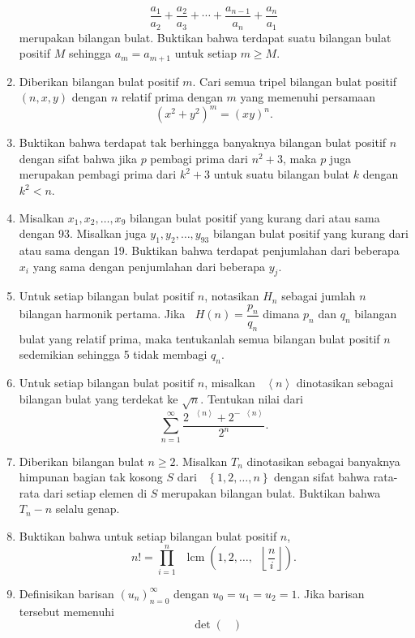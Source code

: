 \documentclass[12pt]{article}
\newcommand*\lrbr[1]{\mathop{}\!\left\lbrace#1\right\rbrace}
\newcommand*\floor[1]{\mathop{}\!\left\lfloor{#1}\right\rfloor}
\newcommand*\braket[1]{\mathop{}\!\left\langle{#1}\right\rangle}
\newcommand*\func[2]{\mathop{}\!{#1}{\left({#2}\right)}}
\DeclareMathOperator{\lcm}{lcm}				%
\begin{document}
\begin{enumerate}[leftmargin=*]
		\[ \frac{a_{1}}{a_{2}} + \frac{a_{2}}{a_{3}} + \cdots + \frac{a_{n - 1}}{a_{n}} + \frac{a_{n}}{a_{1}} \]
		merupakan bilangan bulat. Buktikan bahwa terdapat suatu bilangan bulat positif $ M $ sehingga $ a_{m} = a_{m + 1} $ untuk setiap $ m \geq M $.
		\item Diberikan bilangan bulat positif $ m $. Cari semua tripel bilangan bulat positif $ \left(n, x, y\right) $ dengan $ n $ relatif prima dengan $ m $ yang memenuhi persamaan
		\[ \left(x^{2} + y^{2}\right)^{m} = \left(xy\right)^{n}. \]
		\item Buktikan bahwa terdapat tak berhingga banyaknya bilangan bulat positif $ n $ dengan sifat bahwa jika $ p $ pembagi prima dari $ n^{2} + 3 $, maka $ p $ juga merupakan pembagi prima dari $ k^{2} + 3 $ untuk suatu bilangan bulat $ k $ dengan $ k^{2} < n $.
		\item Misalkan $ x_{1}, x_{2}, \dots, x_{9} $ bilangan bulat positif yang kurang dari atau sama dengan 93. Misalkan juga $ y_{1}, y_{2}, \dots, y_{93} $ bilangan bulat positif yang kurang dari atau sama dengan 19. Buktikan bahwa terdapat penjumlahan dari beberapa $ x_{i} $ yang sama dengan penjumlahan dari beberapa $ y_{j} $.
		\item Untuk setiap bilangan bulat positif $ n $, notasikan $ H_{n} $ sebagai jumlah $ n $ bilangan harmonik pertama. Jika $ \func{H}{n} = \dfrac{p_{n}}{q_{n}} $ dimana $ p_{n} $ dan $ q_{n} $ bilangan bulat yang relatif prima, maka tentukanlah semua bilangan bulat positif $ n $ sedemikian sehingga 5 tidak membagi $ q_{n} $.
		\item Untuk setiap bilangan bulat positif $ n $, misalkan $ \braket{n} $ dinotasikan sebagai bilangan bulat yang terdekat ke $ \sqrt{n} $. Tentukan nilai dari
		\[ \sum_{n = 1}^{\infty}{\frac{2^{\, \braket{n}} + 2^{-\braket{n}}}{2^{n}}}. \]
		\item Diberikan bilangan bulat $ n \geq 2 $. Misalkan $ T_{n} $ dinotasikan sebagai banyaknya himpunan bagian tak kosong $ S $ dari $ \lrbr{1, 2, \dots, n} $ dengan sifat bahwa rata-rata dari setiap elemen di $ S $ merupakan bilangan bulat. Buktikan bahwa $ T_{n} - n $ selalu genap.
		\item Buktikan bahwa untuk setiap bilangan bulat positif $ n $,
		\[ n! = \prod_{i = 1}^{n}{\func{\lcm}{1, 2, \dots, \floor{\frac{n}{i}}}}. \]
		\item Definisikan barisan $ \left(u_{n}\right)_{n = 0}^{\infty} $ dengan $ u_{0} = u_{1} = u_{2} = 1 $. Jika barisan tersebut memenuhi
		\[ \func{\det}{\begin{matrix}

\end{matrix}}\]
\end{enumerate}
\end{document}
